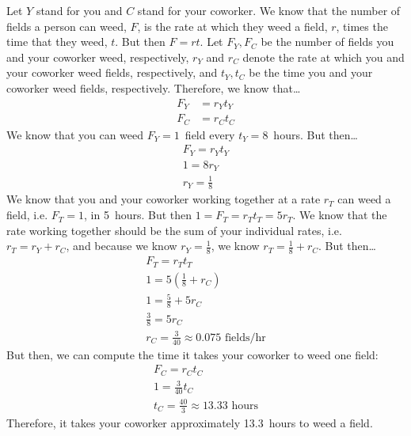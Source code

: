 \documentclass[12pt,letterpaper]{exam}
\begin{document}
\begin{questions}
\sol Let $Y$ stand for you and $C$ stand for your coworker. We know that the number of fields a person can weed, $F$, is the rate at which they weed a field, $r$, times the time that they weed, $t$. But then $F= rt$. Let $F_Y, F_C$ be the number of fields you and your coworker weed, respectively, $r_Y$ and $r_C$ denote the rate at which you and your coworker weed fields, respectively, and $t_Y, t_C$ be the time you and your coworker weed fields, respectively. Therefore, we know that\dots
	\[
	\begin{aligned}
	F_Y&= r_Y t_Y \\[0.3cm]
	F_C&= r_C t_C
	\end{aligned}
	\]
We know that you can weed $F_Y= 1$~field every $t_Y= 8$~hours. But then\dots
	\[
	\begin{gathered}
	F_Y= r_Y t_Y \\
	1= 8r_Y \\
	r_Y= \frac{1}{8}
	\end{gathered}
	\]
We know that you and your coworker working together at a rate $r_T$ can weed a field, i.e. $F_T= 1$, in 5~hours. But then $1=F_T= r_T t_T= 5r_T$. We know that the rate working together should be the sum of your individual rates, i.e. $r_T= r_Y + r_C$, and because we know $r_Y= \frac{1}{8}$, we know $r_T= \frac{1}{8} + r_C$. But then\dots
	\[
	\begin{gathered}
	F_T= r_T t_T \\
	1= 5(\frac{1}{8} + r_C) \\
	1= \frac{5}{8} + 5r_C \\
	\frac{3}{8}= 5r_C \\
	r_C= \frac{3}{40} \approx 0.075 \text{ fields/hr}
	\end{gathered}
	\]
But then, we can compute the time it takes your coworker to weed one field:
	\[
	\begin{gathered}
	F_C= r_C t_C \\
	1= \frac{3}{40} t_C \\
	t_C= \frac{40}{3} \approx 13.33 \text{ hours}
	\end{gathered}
	\]
Therefore, it takes your coworker approximately 13.3~hours to weed a field.


\end{questions}
\end{document}
